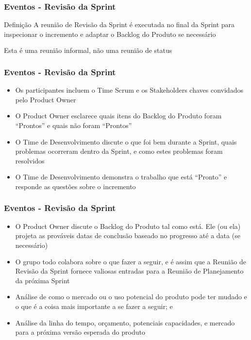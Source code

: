 \begin{frame}
 \frametitle{Eventos - Revisão da Sprint}
\begin{block}{Definição}
 A reunião de Revisão da Sprint é executada no final da Sprint para inspecionar o incremento e adaptar o
Backlog do Produto se necessário
 \end{block}
 \begin{block}{}
Esta é uma reunião informal, não uma reunião de status
 \end{block}
\end{frame}

\begin{frame}
 \frametitle{Eventos - Revisão da Sprint}
 \begin{itemize}
  \item Os participantes incluem o Time Scrum e os Stakeholders chaves convidados pelo Product
Owner
  \item O Product Owner esclarece quais itens do Backlog do Produto foram “Prontos” e quais não
foram “Prontos”
  \item O Time de Desenvolvimento discute o que foi bem durante a Sprint, quais problemas
ocorreram dentro da Sprint, e como estes problemas foram resolvidos
  \item O Time de Desenvolvimento demonstra o trabalho que está “Pronto” e responde as
questões sobre o incremento
 \end{itemize}
\end{frame}

\begin{frame}
 \frametitle{Eventos - Revisão da Sprint}
 \begin{itemize}
\item O Product Owner discute o Backlog do Produto tal como está. Ele (ou ela) projeta as
prováveis datas de conclusão baseado no progresso até a data (se necessário)
\item O grupo todo colabora sobre o que fazer a seguir, e é assim que a Reunião de Revisão da
Sprint fornece valiosas entradas para a Reunião de Planejamento da próxima Sprint
\item Análise de como o mercado ou o uso potencial do produto pode ter mudado e o que é a
coisa mais importante a se fazer a seguir; e
\item Análise da linha do tempo, orçamento, potenciais capacidades, e mercado para a próxima
versão esperada do produto
 \end{itemize}
\end{frame}

